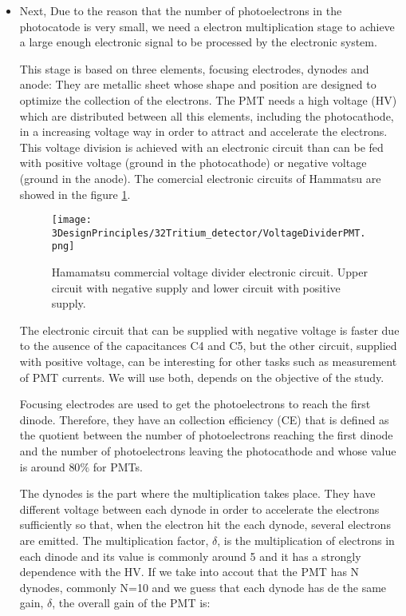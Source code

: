 \begin{itemize}
\item{} Next, Due to the reason that the number of photoelectrons in the photocatode is very small, we need a electron multiplication stage to achieve a large enough electronic signal to be processed by the electronic system. 

This stage is based on three elements, focusing electrodes, dynodes and anode: They are metallic sheet whose shape and position are designed to optimize the collection of the electrons. The PMT needs a high voltage (HV) which are distributed between all this elements, including the photocathode, in a increasing voltage way in order to attract and accelerate the electrons. This voltage division is achieved with an electronic circuit than can be fed with positive voltage (ground in the photocathode) or negative voltage (ground in the anode). The comercial electronic circuits of Hammatsu are showed in the figure \ref{fig:VoltageDividerCircuit}.

\begin{figure}[htbp]
\centering
\texttt{[image: 3DesignPrinciples/32Tritium\_detector/VoltageDividerPMT.png]}
\caption{Hamamatsu commercial voltage divider electronic circuit. Upper circuit with negative supply and lower circuit with positive supply.\label{fig:VoltageDividerCircuit}~\cite{DataSheetPMTs}}
\end{figure}

The electronic circuit that can be supplied with negative voltage is faster due to the ausence of the capacitances C4 and C5, but the other circuit, supplied with positive voltage, can be interesting for other tasks such as measurement of PMT currents. We will use both, depends on the objective of the study.

Focusing electrodes are used to get the photoelectrons to reach the first dinode. Therefore, they have an collection efficiency (CE) that is defined as the quotient between the number of photoelectrons reaching the first dinode and the number of photoelectrons leaving the photocathode and whose value is around $80\%$ for PMTs.

The dynodes is the part where the multiplication takes place. They have different voltage between each dynode in order to accelerate the electrons sufficiently so that, when the electron hit the each dynode, several electrons are emitted. The multiplication factor, $\delta$, is the multiplication of electrons in each dinode and its value is commonly around 5 and it has a strongly dependence with the HV. If we take into accout that the PMT has N dynodes, commonly N=10 and we guess that each dynode has de the same gain, $\delta$, the overall gain of the PMT is:


\end{itemize}

